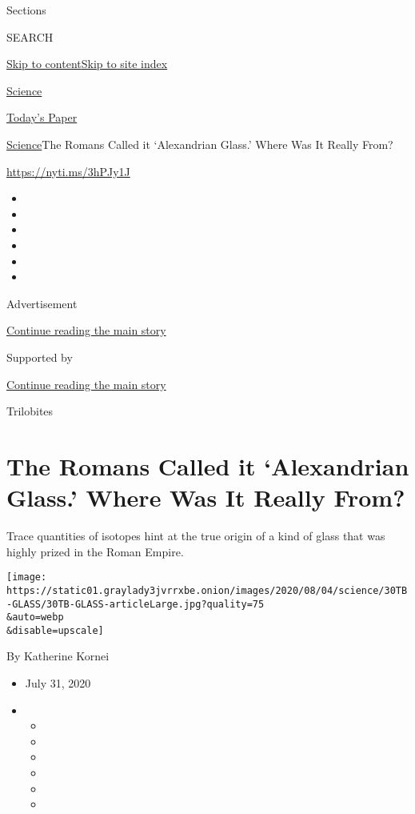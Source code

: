 Sections

SEARCH

\protect\hyperlink{site-content}{Skip to
content}\protect\hyperlink{site-index}{Skip to site index}

\href{https://www.nytimes3xbfgragh.onion/section/science}{Science}

\href{https://myaccount.nytimes3xbfgragh.onion/auth/login?response_type=cookie\&client_id=vi}{}

\href{https://www.nytimes3xbfgragh.onion/section/todayspaper}{Today's
Paper}

\href{/section/science}{Science}\textbar{}The Romans Called it
`Alexandrian Glass.' Where Was It Really From?

\url{https://nyti.ms/3hPJy1J}

\begin{itemize}
\item
\item
\item
\item
\item
\item
\end{itemize}

Advertisement

\protect\hyperlink{after-top}{Continue reading the main story}

Supported by

\protect\hyperlink{after-sponsor}{Continue reading the main story}

Trilobites

\hypertarget{the-romans-called-it-alexandrian-glass-where-was-it-really-from}{%
\section{The Romans Called it `Alexandrian Glass.' Where Was It Really
From?}\label{the-romans-called-it-alexandrian-glass-where-was-it-really-from}}

Trace quantities of isotopes hint at the true origin of a kind of glass
that was highly prized in the Roman Empire.

\texttt{[image: https://static01.graylady3jvrrxbe.onion/images/2020/08/04/science/30TB-GLASS/30TB-GLASS-articleLarge.jpg?quality=75\\\&auto=webp\\\&disable=upscale]}

By Katherine Kornei

\begin{itemize}
\item
  July 31, 2020
\item
  \begin{itemize}
  \item
  \item
  \item
  \item
  \item
  \item
  \end{itemize}
\end{itemize}

